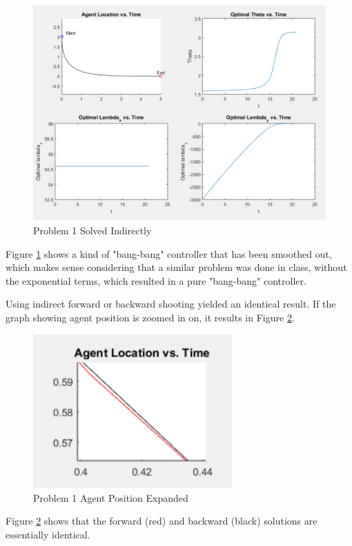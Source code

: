 \documentclass[12pt,letterpaper]{article}
\begin{document}
\clearpage


\begin{figure}[!h]
\centering
\includegraphics[width=5in]{prob1indirect.png}
\caption{Problem 1 Solved Indirectly}
\label{fig:prob1indirect}
\end{figure}

Figure \ref{fig:prob1indirect} shows a kind of "bang-bang" controller that has been smoothed out, which makes sense considering that a similar problem was done in class, without the exponential terms, which resulted in a pure "bang-bang" controller. 

Using indirect forward or backward shooting yielded an identical result. If the graph showing agent position is zoomed in on, it results in Figure \ref{fig:prob1zoom}.


\begin{figure}[!h]
\centering
\includegraphics[width=3in]{prob1zoom.png}
\caption{Problem 1 Agent Position Expanded}
\label{fig:prob1zoom}
\end{figure}

Figure \ref{fig:prob1zoom} shows that the forward (red) and backward (black) solutions are essentially identical.
\end{document}
